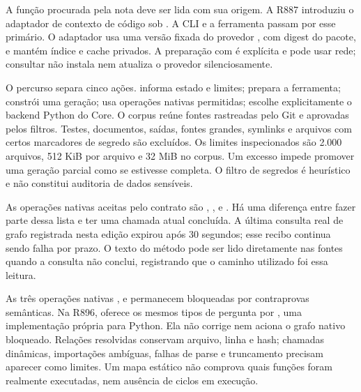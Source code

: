 \begin{descricao}
A função procurada pela nota deve ser lida com sua origem. A R887 introduziu o
adaptador de contexto de código sob
. A CLI
 e a ferramenta  passam por esse
primário. O adaptador usa uma versão fixada do provedor ,
com digest do pacote, e mantém índice e cache privados. A preparação com
 é explícita e pode usar rede; consultar não instala nem atualiza
o provedor silenciosamente.
\end{descricao}

\begin{metodo}
O percurso separa cinco ações.  informa estado e limites;
 prepara a ferramenta;  constrói uma geração;
 usa operações nativas permitidas;  escolhe
explicitamente o backend Python do Core. O corpus reúne fontes rastreadas
pelo Git e aprovadas pelos filtros. Testes, documentos, saídas, fontes grandes,
symlinks e arquivos com certos marcadores de segredo são excluídos. Os limites
inspecionados são 2.000 arquivos, 512 KiB por arquivo e 32 MiB no corpus.
Um excesso impede promover uma geração parcial como se estivesse completa.
O filtro de segredos é heurístico e não constitui auditoria de dados sensíveis.
\end{metodo}

\begin{resultado}
As operações nativas aceitas pelo contrato são ,
,  e
. Há uma diferença entre fazer parte dessa lista e
ter uma chamada atual concluída. A última consulta real de grafo registrada
nesta edição expirou após 30 segundos; esse recibo continua sendo falha por
prazo. O texto do método pode ser lido diretamente nas fontes quando a consulta
não conclui, registrando que o caminho utilizado foi essa leitura.
\end{resultado}

\begin{limite}
As três operações nativas ,  e
 permanecem bloqueadas por contraprovas semânticas.
Na R896,  oferece os mesmos tipos de pergunta por
, uma implementação própria para Python. Ela não corrige
nem aciona o grafo nativo bloqueado. Relações resolvidas conservam arquivo,
linha e hash; chamadas dinâmicas, importações ambíguas, falhas de parse e
truncamento precisam aparecer como limites. Um mapa estático não comprova
quais funções foram realmente executadas, nem ausência de ciclos em execução.
\end{limite}

